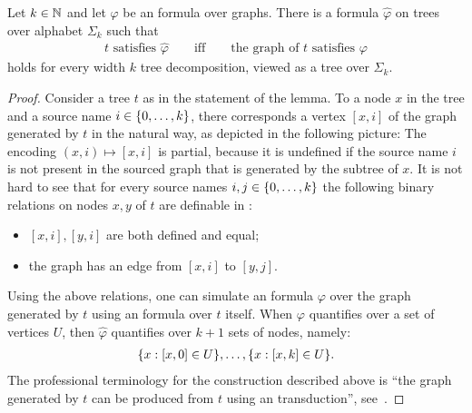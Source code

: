 \begin{lemma}
Let $k \in \mathbb{N}$ and let $\varphi$ be an \mso formula over graphs. There is a \mso formula $\hat \varphi$ on trees over alphabet $\Sigma_k$ such that
\begin{align*}
	\text{$t$ satisfies $\hat \varphi$} \qquad \text{iff} \qquad \text{the graph of $t$ satisfies $\varphi$} 
\end{align*}
holds for every width $k$ tree decomposition, viewed as a tree over $\Sigma_k$.
\end{lemma}
\begin{proof}
	Consider a tree $t$ as in the statement of the lemma.  To a node  $x$ in the tree and a source name $i \in \{0,\ldots,k\}$, there corresponds  a vertex $[x,i]$ of the graph  generated by $t$ in the natural way, as depicted in the following picture:
	The encoding $(x,i) \mapsto [x,i]$ is partial, because it is undefined if the source name $i$ is not  present in the sourced graph that is generated by the subtree of $x$. It is not hard to see that for every source names $i,j \in \{0,\ldots,k\}$ the following binary relations on nodes $x,y$ of $t$ are definable in \mso:
	\begin{itemize}
	\item   $[x,i],[y,i]$ are both defined and equal;
	\item  the graph has an edge from $[x,i]$ to $[y,j]$.		
	\end{itemize}
	 Using the above relations, one can simulate an \mso  formula $\varphi$ over the graph generated by $t$  using an \mso formula over $t$ itself.  When $\varphi$ quantifies over a set of vertices $U$, then $\hat \varphi$ quantifies over $k+1$ sets of nodes, namely:
\begin{align*}
\{x : [x,0] \in U\}, \ldots, \{x : [x,k] \in U\}.
\end{align*}
The professional terminology for the construction described above is  ``the graph generated by $t$ can be produced from $t$ using an \mso transduction'', see~\cite[Section 1.7]{Engelfriet:2012wq}.
\end{proof}


